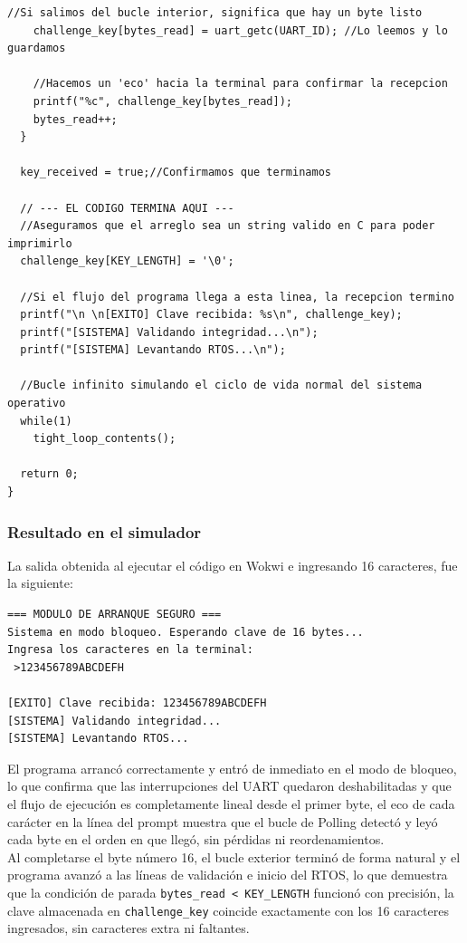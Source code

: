 \documentclass[12pt,letterpaper]{article}
\begin{document}
\begin{lstlisting}[style=modernc, caption={main.c: driver de arranque seguro implementado con Polling}]
    //Si salimos del bucle interior, significa que hay un byte listo
    challenge_key[bytes_read] = uart_getc(UART_ID); //Lo leemos y lo guardamos
    
    //Hacemos un 'eco' hacia la terminal para confirmar la recepcion
    printf("%c", challenge_key[bytes_read]); 
    bytes_read++;
  }
  
  key_received = true;//Confirmamos que terminamos
  
  // --- EL CODIGO TERMINA AQUI ---
  //Aseguramos que el arreglo sea un string valido en C para poder imprimirlo
  challenge_key[KEY_LENGTH] = '\0';

  //Si el flujo del programa llega a esta linea, la recepcion termino
  printf("\n \n[EXITO] Clave recibida: %s\n", challenge_key);
  printf("[SISTEMA] Validando integridad...\n");
  printf("[SISTEMA] Levantando RTOS...\n");
 
  //Bucle infinito simulando el ciclo de vida normal del sistema operativo
  while(1)
    tight_loop_contents();
  
  return 0;
}
\end{lstlisting}

\bigskip

\subsubsection*{Resultado en el simulador}

La salida obtenida al ejecutar el código en Wokwi e ingresando 16 caracteres, fue la siguiente:

\begin{Verbatim}[frame=single, fontsize=\footnotesize]
=== MODULO DE ARRANQUE SEGURO ===
Sistema en modo bloqueo. Esperando clave de 16 bytes...
Ingresa los caracteres en la terminal:
 >123456789ABCDEFH

[EXITO] Clave recibida: 123456789ABCDEFH
[SISTEMA] Validando integridad...
[SISTEMA] Levantando RTOS...
\end{Verbatim}

El programa arrancó correctamente y entró de inmediato en el modo de bloqueo, lo que confirma que las
interrupciones del UART quedaron deshabilitadas y que el flujo de ejecución es completamente lineal desde el
primer byte, el eco de cada carácter en la línea del prompt muestra que el bucle de Polling detectó y leyó cada
byte en el orden en que llegó, sin pérdidas ni reordenamientos.\\

Al completarse el byte número 16, el bucle exterior terminó de forma natural y el programa avanzó a las líneas de
validación e inicio del RTOS, lo que demuestra que la condición de parada \texttt{bytes\_read < KEY\_LENGTH}
funcionó con precisión, la clave almacenada en \texttt{challenge\_key} coincide exactamente con los 16
caracteres ingresados, sin caracteres extra ni faltantes.\\
\end{document}
